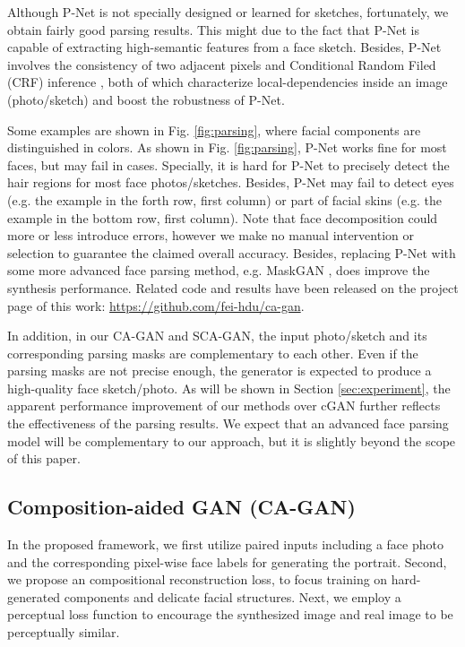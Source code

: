 \documentclass[journal]{IEEEtran}
\begin{document}
Although P-Net is not specially designed or learned for sketches, fortunately, we obtain fairly good parsing results. This might due to the fact that P-Net is capable of extracting high-semantic features from a face sketch. Besides, P-Net involves the consistency of two adjacent pixels and Conditional Random Filed (CRF) inference \cite{Liu2015Multi}, both of which characterize local-dependencies inside an image (photo/sketch) and boost the robustness of P-Net.

Some examples are shown in Fig. \ref{fig:parsing}, where facial components are distinguished in colors.  
As shown in Fig. \ref{fig:parsing}, P-Net works fine for most faces, but may fail in cases. Specially, it is hard for P-Net to precisely detect the hair regions for most face photos/sketches. Besides, P-Net may fail to detect eyes (e.g. the example in the forth row, first column) or part of facial skins (e.g. the example in the bottom row, first column). 
Note that face decomposition could more or less introduce errors, however we make no manual intervention or selection to guarantee the claimed overall accuracy. Besides, replacing P-Net with some more advanced face parsing method, e.g. MaskGAN \cite{CelebAMaskHQ}, does improve the synthesis performance. Related code and results have been released on the project page of this work: \url{https://github.com/fei-hdu/ca-gan}.  

In addition, in our CA-GAN and SCA-GAN, the input photo/sketch and its corresponding parsing masks are complementary to each other. Even if the parsing masks are not precise enough, the generator is expected to produce a high-quality face sketch/photo. As will be shown in Section \ref{sec:experiment}, the apparent performance improvement of our methods over cGAN further reflects the effectiveness of the parsing results. We expect that an advanced face parsing model will be complementary to our approach, but it is slightly beyond the scope of this paper.


\subsection{Composition-aided GAN (CA-GAN)}
\label{sec:composegan}


In the proposed framework, we first utilize paired inputs including a face photo and the corresponding pixel-wise face labels for generating the portrait.
Second, we propose an compositional reconstruction loss, to focus training on hard-generated components and delicate facial structures.
Next, we employ a perceptual loss function to encourage the synthesized image and real image to be perceptually similar. 
\end{document}
